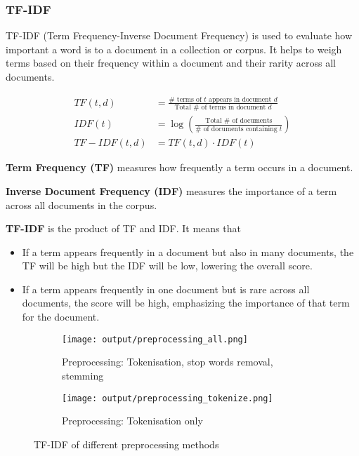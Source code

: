\subsubsection{TF-IDF \cite{learndatasci_tfidf}}
TF-IDF (Term Frequency-Inverse Document Frequency)  is used to evaluate how important a word is to a document in a collection or corpus.
It helps to weigh terms based on their frequency within a document and their rarity across all documents.

\begin{align}
    TF(t,d) &= \frac{\# \text{ terms of } t \text{ appears in document } d}{\text{Total } \# \text{ of terms in document }d}\\
    IDF(t) &= \log \left( \frac{\text{Total } \# \text{ of documents}}{\# \text{ of documents containing } t} \right)\\
    TF-IDF(t, d) &= TF(t,d) \cdot IDF(t)
\end{align}

\textbf{Term Frequency (TF)} measures how frequently a term occurs in a document.

\textbf{Inverse Document Frequency (IDF)} measures the importance of a term across all documents in the corpus.

\textbf{TF-IDF} is the product of TF and IDF. It means that 
\begin{itemize}
    \item If a term appears frequently in a document but also in many documents, the TF will be high but the IDF will be low, lowering the overall score.
    \item If a term appears frequently in one document but is rare across all documents, the score will be high, emphasizing the importance of that term for the document.
\end{itemize}


\begin{figure}[h]
    \centering
    \begin{subfigure}[b]{0.45\textwidth}
        \texttt{[image: output/preprocessing\_all.png]}
        \caption{Preprocessing: Tokenisation, stop words removal, stemming}
        \label{fig:preprocessing_all}
    \end{subfigure}
    \hfill
    \begin{subfigure}[b]{0.45\textwidth}
        \texttt{[image: output/preprocessing\_tokenize.png]}
        \caption{Preprocessing: Tokenisation only}
        \label{fig:preprocessing_tokenize}
    \end{subfigure}
    \caption{TF-IDF of different preprocessing methods}
    \label{fig:preprocessing}
\end{figure}

